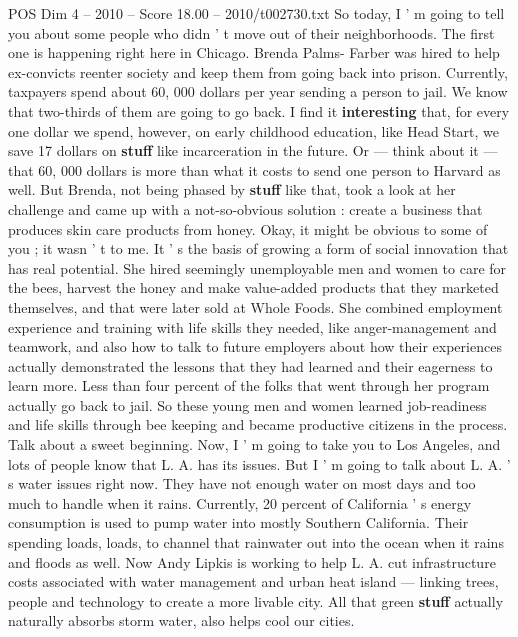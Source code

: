\begin{textsample}{POS Dim 4 – 2010 – Score 18.00 – 2010/t002730.txt}  \label{ex:f4_pos_062}
So today, I ' m going to tell you about some people who didn ' t move out of their neighborhoods.
The first one is happening right here in Chicago.
Brenda Palms- Farber was hired to help ex-convicts reenter society and keep them from going back into prison.
Currently, taxpayers spend about 60, 000 dollars per year sending a person to jail.
We know that two-thirds of them are going to go back.
I find it \textbf{interesting} that, for every one dollar we spend, however, on early childhood education, like Head Start, we save 17 dollars on \textbf{stuff} like incarceration in the future.
Or — think about it — that 60, 000 dollars is more than what it costs to send one person to Harvard as well.
But Brenda, not being phased by \textbf{stuff} like that, took a look at her challenge and came up with a not-so-obvious solution : create a business that produces skin care products from honey.
Okay, it might be obvious to some of you ; it wasn ' t to me.
It ' s the basis of growing a form of social innovation that has real potential.
She hired seemingly unemployable men and women to care for the bees, harvest the honey and make value-added products that they marketed themselves, and that were later sold at Whole Foods.
She combined employment experience and training with life skills they needed, like anger-management and teamwork, and also how to talk to future employers about how their experiences actually demonstrated the lessons that they had learned and their eagerness to learn more.
Less than four percent of the folks that went through her program actually go back to jail.
So these young men and women learned job-readiness and life skills through bee keeping and became productive citizens in the process.
Talk about a sweet beginning.
Now, I ' m going to take you to Los Angeles, and lots of people know that L.
A. has its issues.
But I ' m going to talk about L.
A. ' s water issues right now.
They have not enough water on most days and too much to handle when it rains.
Currently, 20 percent of California ' s energy consumption is used to pump water into mostly Southern California.
Their spending loads, loads, to channel that rainwater out into the ocean when it rains and floods as well.
Now Andy Lipkis is working to help L.
A. cut infrastructure costs associated with water management and urban heat island — linking trees, people and technology to create a more livable city.
All that green \textbf{stuff} actually naturally absorbs storm water, also helps cool our cities.

\end{textsample}
